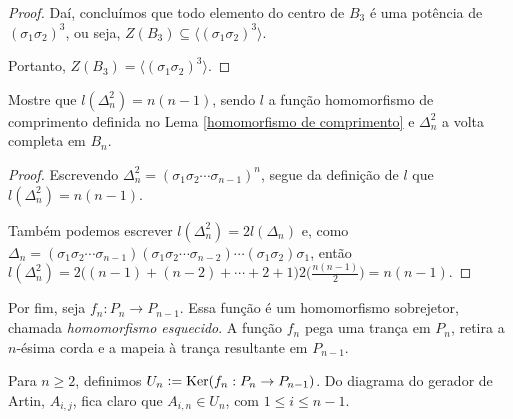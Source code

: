 \begin{proof}
		\par\vspace{0.3cm} Daí, concluímos que todo elemento do centro de $B_3$ é uma potência de $(\sigma_1\sigma_2)^3$, ou seja, $Z(B_3)\subseteq\langle (\sigma_1\sigma_2)^3 \rangle$.
		
		\par\vspace{0.3cm} Portanto, $Z(B_3) = \langle (\sigma_1\sigma_2)^3 \rangle$.
		
	\end{proof}
	
	\begin{prop}
		Mostre que $l(\Delta_n^2) = n(n-1)$, sendo $l$ a função homomorfismo de comprimento definida no Lema \eqref{homomorfismo de comprimento} e $\Delta_n^2$ a volta completa em $B_n$.
	\end{prop}
	
	\begin{proof}
		Escrevendo $\Delta_n^2 = (\sigma_1\sigma_2\cdots\sigma_{n-1})^n$, segue da definição de $l$ que $l(\Delta_n^2) = n(n-1)$. 
		
		\par\vspace{0.3cm} Também podemos escrever $l(\Delta_n^2) = 2l(\Delta_n)$ e, como $\Delta_n = (\sigma_1\sigma_2\cdots\sigma_{n-1})(\sigma_1\sigma_2\cdots\sigma_{n-2})\cdots(\sigma_1\sigma_2)\sigma_1$, então $l(\Delta_n^2) = 2\Big( (n-1) + (n-2) + \cdots + 2 + 1 \Big) 2\Big( \displaystyle{\frac{n(n-1)}{2}} \Big) = n(n-1)$.
		
	\end{proof}
	
	
	
	
	
	\par\vspace{0.3cm} Por fim, seja $f_n: P_n\to P_{n-1}$. Essa função é um homomorfismo sobrejetor, chamada \textit{homomorfismo esquecido}. A função $f_n$ pega uma trança em $P_n$, retira a $n$-ésima corda e a mapeia à trança resultante em $P_{n-1}$.
	\par\vspace{0.3cm} Para $n\geq 2$, definimos $U_n\vcentcolon=\operatorname{Ker}(f_n: P_n\to P_{n-1})$. Do diagrama do gerador de Artin, $A_{i,j}$, fica claro que $A_{i,n}\in U_n$, com $1\leq i\leq n-1$. 
	
